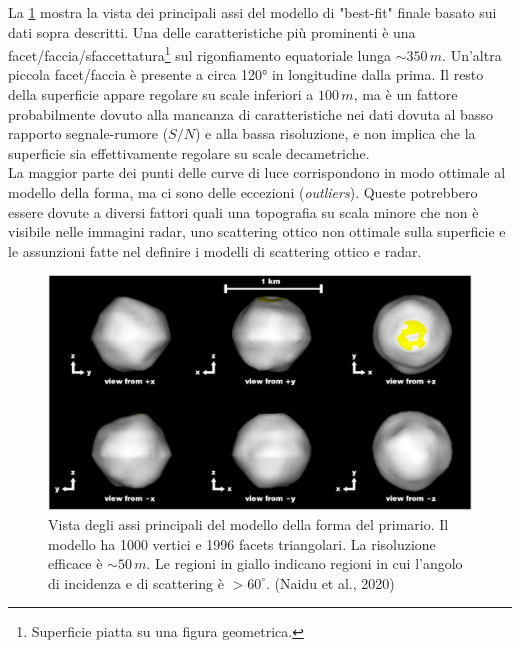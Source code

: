\documentclass[a4paper,11pt,openright]{book}
\begin{document}
La \cref{fig:didymos_shape_model} mostra la vista dei principali assi del modello di "best-fit" finale basato sui dati sopra descritti. Una delle caratteristiche più prominenti è una facet/faccia/sfaccettatura\footnote{Superficie piatta su una figura geometrica.} sul rigonfiamento equatoriale lunga $\sim 350\,m$. Un'altra piccola facet/faccia è presente a circa 120° in longitudine dalla prima. Il resto della superficie appare regolare su scale inferiori a $100\,m$, ma è un fattore probabilmente dovuto alla mancanza di caratteristiche nei dati dovuta al basso rapporto segnale-rumore ($S/N$) e alla bassa risoluzione, e non implica che la superficie sia effettivamente regolare su scale decametriche.\\
La maggior parte dei punti delle curve di luce corrispondono in modo ottimale al modello della forma, ma ci sono delle eccezioni (\textit{outliers}). Queste potrebbero essere dovute a diversi fattori quali una topografia su scala minore che non è visibile nelle immagini radar, uno scattering ottico non ottimale sulla superficie e le assunzioni fatte nel definire i modelli di scattering ottico e radar.

\begin{figure}
    \centering
    \includegraphics[scale=0.78]{figure/didymos_shape_model.jpg}
    \caption[Vista degli assi principali del modello della forma del primario.]{Vista degli assi principali del modello della forma del primario. Il modello ha 1000 vertici e 1996 facets triangolari. La risoluzione efficace è $\sim 50\,m$. Le regioni in giallo indicano regioni in cui l'angolo di incidenza e di scattering è $>60^\circ$. (Naidu et al., 2020)}
    \label{fig:didymos_shape_model}
\end{figure}
\end{document}
